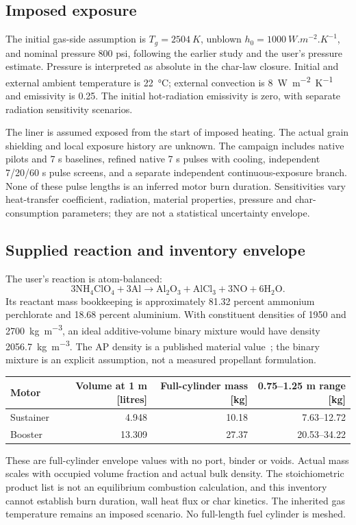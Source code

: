 \documentclass[oneside,openany]{amsdtx}
\begin{document}
\subsection{Imposed exposure}
The initial gas-side assumption is \(T_g=\SI{2504}{K}\), unblown \(h_0=\SI{1000}{W.m^{-2}.K^{-1}}\), and nominal pressure 800 psi, following the earlier study and the user's pressure estimate. Pressure is interpreted as absolute in the char-law closure. Initial and external ambient temperature is \SI{22}{\degreeCelsius}; external convection is \SI{8}{W.m^{-2}.K^{-1}} and emissivity is 0.25. The initial hot-radiation emissivity is zero, with separate radiation sensitivity scenarios.

The liner is assumed exposed from the start of imposed heating. The actual grain shielding and local exposure history are unknown. The campaign includes native pilots and 7 s baselines, refined native 7 s pulses with cooling, independent 7/20/60 s pulse screens, and a separate independent continuous-exposure branch. None of these pulse lengths is an inferred motor burn duration. Sensitivities vary heat-transfer coefficient, radiation, material properties, pressure and char-consumption parameters; they are not a statistical uncertainty envelope.

\subsection{Supplied reaction and inventory envelope}
The user's reaction is atom-balanced:
\[3\mathrm{NH_4ClO_4}+3\mathrm{Al}\longrightarrow\mathrm{Al_2O_3}+\mathrm{AlCl_3}+3\mathrm{NO}+6\mathrm{H_2O}.\]
Its reactant mass bookkeeping is approximately 81.32 percent ammonium perchlorate and 18.68 percent aluminium. With constituent densities of 1950 and \SI{2700}{kg.m^{-3}}, an ideal additive-volume binary mixture would have density \SI{2056.7}{kg.m^{-3}}. The AP density is a published material value~\cite{ap}; the binary mixture is an explicit assumption, not a measured propellant formulation.
\begin{table}[H]\centering\small
\begin{tabular}{lrrr}\toprule
Motor & Volume at 1 m [litres] & Full-cylinder mass [kg] & 0.75--1.25 m range [kg]\\\midrule
Sustainer & 4.948 & 10.18 & 7.63--12.72\\
Booster & 13.309 & 27.37 & 20.53--34.22\\\bottomrule
\end{tabular}\end{table}
These are full-cylinder envelope values with no port, binder or voids. Actual mass scales with occupied volume fraction and actual bulk density. The stoichiometric product list is not an equilibrium combustion calculation, and this inventory cannot establish burn duration, wall heat flux or char kinetics. The inherited gas temperature remains an imposed scenario. No full-length fuel cylinder is meshed.
\end{document}
